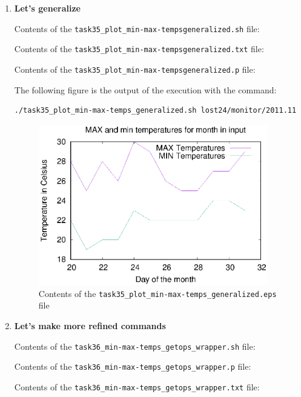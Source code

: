 \documentclass[9pt]{article}
\begin{document}
\begin{enumerate}
	\item \textbf{Let's generalize}
	
		Contents of the \texttt{task35\_plot\_min-max-tempsgeneralized.sh} file:
		
		Contents of the \texttt{task35\_plot\_min-max-tempsgeneralized.txt} file:
		
		Contents of the \texttt{task35\_plot\_min-max-tempsgeneralized.p} file:
		
		The following figure is the output of the execution with the command:
		\begin{lstlisting}
./task35_plot_min-max-temps_generalized.sh lost24/monitor/2011.11
		\end{lstlisting}
	
		\begin{figure}[h!]
			\centering
			\includegraphics[width=10cm]{../task34_plot_min-max-temps_generalized.eps}
			\caption{Contents of the \texttt{task35\_plot\_min-max-temps\_generalized.eps} file}
		\end{figure}		
	
	\item \textbf{Let's make more refined commands}
	
		Contents of the \texttt{task36\_min-max-temps\_getops\_wrapper.sh} file:
				
		Contents of the \texttt{task36\_min-max-temps\_getops\_wrapper.p} file:
		
		Contents of the \texttt{task36\_min-max-temps\_getops\_wrapper.txt} file:
		

\end{enumerate}
\end{document}

